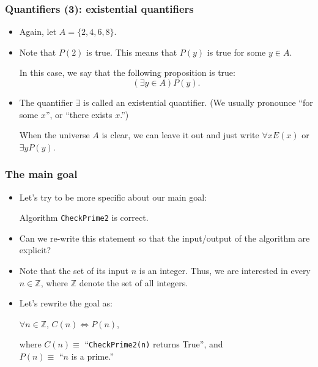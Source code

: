 \begin{frame}\frametitle{Quantifiers (3): existential quantifiers}
  \begin{itemize}
  \item Again, let $A=\{2,4,6,8\}$.
  \item Note that $P(2)$ is true.  This means that $P(y)$ is true for
    some $y\in A$.  \pause

    In this case, we say that the following proposition is true:
    \[(\exists y\in A) P(y). \]
    \pause
    
  \item The quantifier $\exists$ is called an existential quantifier.
    (We usually pronounce ``for some $x$'', or ``there exists $x$.'')
    \pause

    \begin{tcolorbox}
      When the universe $A$ is clear, we can leave it out and just
      write $\forall x E(x)$ or $\exists y P(y)$.
    \end{tcolorbox}

  \end{itemize}
\end{frame}

\begin{frame}\frametitle{The main goal}
  \begin{itemize}
  \item
    Let's try to be more specific about our main goal:
    
    \begin{tcolorbox}
      Algorithm {\tt CheckPrime2} is correct.
    \end{tcolorbox}

  \item
    Can we re-write this statement so that the input/output of the
    algorithm are explicit?

  \item
    Note that the set of its input $n$ is an integer.  Thus, we are
    interested in every $n\in\mathbb Z$, where $\mathbb Z$ denote the
    set of all integers.

  \item
    Let's rewrite the goal as:

    \begin{tcolorbox}
      \begin{center}
        $\forall n\in\mathbb Z$,
        $C(n)\Leftrightarrow P(n)$,
      \end{center}
    \end{tcolorbox}

    where $C(n)\equiv$ \pause ``{\tt CheckPrime2(n)} returns True'', and \\
    $P(n)\equiv$ \pause ``$n$ is a prime.''
  \end{itemize}
\end{frame}

